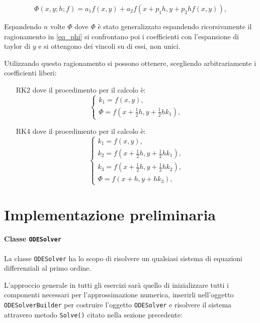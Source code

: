 \begin{equation}
	\label{eq_phi}
	\Phi(x, y; h; f) = a_1 f(x, y) + a_2 f(x + p_1 h, y + p_2 h f(x, y)),
\end{equation}

Espandendo $n$ volte $\Phi$ dove $\Phi$ è stato generalizzato espandendo
ricorsivamente il ragionamento in \ref{eq_phi} si confrontano poi i
coefficienti con l'espansione di taylor di $y$ e si ottengono dei vincoli su
di essi, non unici.

Utilizzando questo ragionamento si possono ottenere, scegliendo arbitrariamente
i coefficienti liberi:
\begin{itemize}

	\item[RK2] dove il procedimento per il calcolo è:
		\[
			\begin{cases}
				k_1 = f(x, y), \\
				\Phi = f(x + \frac{1}{2} h, y + \frac{1}{2} h k_1),
			\end{cases}
		\]

	\item[RK4] dove il procedimento per il calcolo è:
		\[
			\begin{cases}
				k_1 = f(x, y),                                                \\
				k_2 = f\left(x + \frac{1}{2} h, y + \frac{1}{2} h k_1\right), \\
				k_3 = f\left(x + \frac{1}{2} h, y + \frac{1}{2} h k_2\right), \\
				\Phi = f(x + h, y + h k_3),
			\end{cases}
		\]
\end{itemize}

\section{Implementazione preliminaria}

\paragraph{Classe \texttt{ODESolver}} La classe \texttt{ODESolver} ha lo scopo di
risolvere un qualsiasi sistema di equazioni differenziali al primo ordine.

L'approccio generale in tutti gli esercizi sarà quello di inizializzare tutti i
componenti necessari per l'approssimazione numerica, inserirli nell'oggetto
\texttt{ODESolverBuilder} per costruire l'oggetto \texttt{ODESolver} e risolvere
il sistema attravero metodo \texttt{Solve()} citato nella sezione
precedente:

